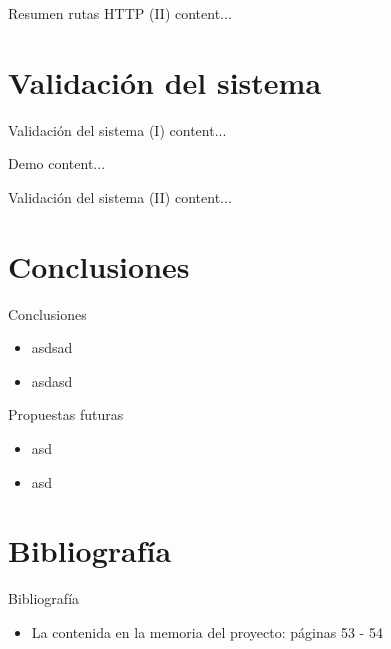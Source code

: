 \documentclass[aspectratio=169,xcolor=dvipsnames]{beamer}
\begin{document}
	\begin{frame}{Resumen rutas HTTP (II)}
		content...
	\end{frame}
	
	
	\section{Validación del sistema}
	
	\begin{frame}{Validación del sistema (I)}
		content...
		
		\begin{exampleblock}{Demo}
			content...
		\end{exampleblock}
	\end{frame}

	\begin{frame}{Validación del sistema (II)}
		content...
	\end{frame}
	
	
	\section{Conclusiones}
	
	\begin{frame}{Conclusiones}
		\begin{itemize}
			\item asdsad
			\item asdasd
		\end{itemize}
	
		\begin{exampleblock}{Propuestas futuras}
			\begin{itemize}
				\item asd
				
				\item asd
			\end{itemize}
		\end{exampleblock}
	\end{frame}
	
	
	\section{Bibliografía}
	
	\begin{frame}{Bibliografía}
		\begin{itemize}
		    \item La contenida en la memoria del proyecto: páginas 53 - 54
		\end{itemize}
	\end{frame}
	
\end{document}
